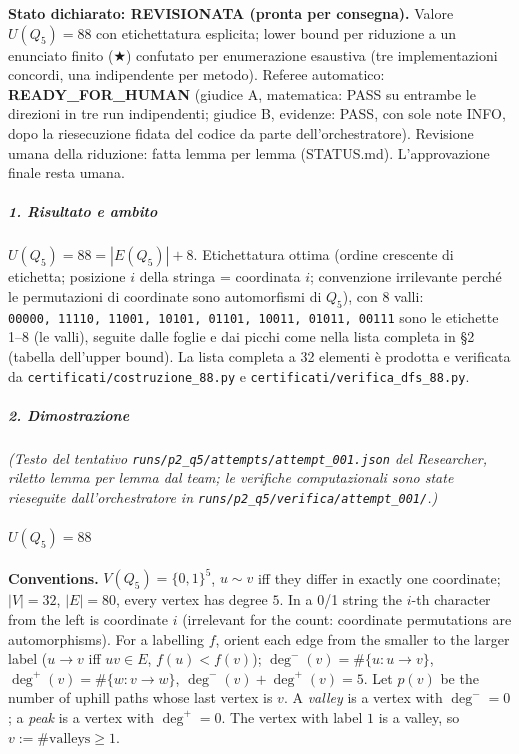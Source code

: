 \documentclass[11pt,a4paper]{article}
\begin{document}
\textbf{Stato dichiarato: REVISIONATA (pronta per consegna).} Valore
\(U(Q_5)=88\) con etichettatura esplicita; lower bound per riduzione a
un enunciato finito (★) confutato per enumerazione esaustiva (tre
implementazioni concordi, una indipendente per metodo). Referee
automatico: \textbf{READY\_FOR\_HUMAN} (giudice A, matematica: PASS su
entrambe le direzioni in tre run indipendenti; giudice B, evidenze:
PASS, con sole note INFO, dopo la riesecuzione fidata del codice da
parte dell'orchestratore). Revisione umana della riduzione: fatta lemma
per lemma (STATUS.md). L'approvazione finale resta umana.

\subparagraph{1. Risultato e ambito}\label{risultato-e-ambito}

\(U(Q_5) = 88 = |E(Q_5)| + 8\). Etichettatura ottima (ordine crescente
di etichetta; posizione \(i\) della stringa = coordinata \(i\);
convenzione irrilevante perché le permutazioni di coordinate sono
automorfismi di \(Q_5\)), con 8 valli:
\texttt{00000,\ 11110,\ 11001,\ 10101,\ 01101,\ 10011,\ 01011,\ 00111}
sono le etichette 1--8 (le valli), seguite dalle foglie e dai picchi
come nella lista completa in §2 (tabella dell'upper bound). La lista
completa a 32 elementi è prodotta e verificata da
\texttt{certificati/costruzione\_88.py} e
\texttt{certificati/verifica\_dfs\_88.py}.

\subparagraph{2. Dimostrazione}\label{dimostrazione}

\emph{(Testo del tentativo
\texttt{runs/p2\_q5/attempts/attempt\_001.json} del Researcher, riletto
lemma per lemma dal team; le verifiche computazionali sono state
rieseguite dall'orchestratore in
\texttt{runs/p2\_q5/verifica/attempt\_001/}.)}

\paragraph{\texorpdfstring{\(U(Q_5) = 88\)}{U(Q\_5) = 88}}\label{uq_5-88}

\textbf{Conventions.} \(V(Q_5)=\{0,1\}^5\), \(u\sim v\) iff they differ
in exactly one coordinate; \(|V|=32\), \(|E|=80\), every vertex has
degree \(5\). In a 0/1 string the \(i\)-th character from the left is
coordinate \(i\) (irrelevant for the count: coordinate permutations are
automorphisms). For a labelling \(f\), orient each edge from the smaller
to the larger label (\(u\to v\) iff \(uv\in E\), \(f(u)<f(v)\));
\(\deg^-(v)=\#\{u:u\to v\}\), \(\deg^+(v)=\#\{w:v\to w\}\),
\(\deg^-(v)+\deg^+(v)=5\). Let \(p(v)\) be the number of uphill paths
whose last vertex is \(v\). A \emph{valley} is a vertex with
\(\deg^-=0\); a \emph{peak} is a vertex with \(\deg^+=0\). The vertex
with label \(1\) is a valley, so \(v:=\#\text{valleys}\ge1\).
\end{document}
